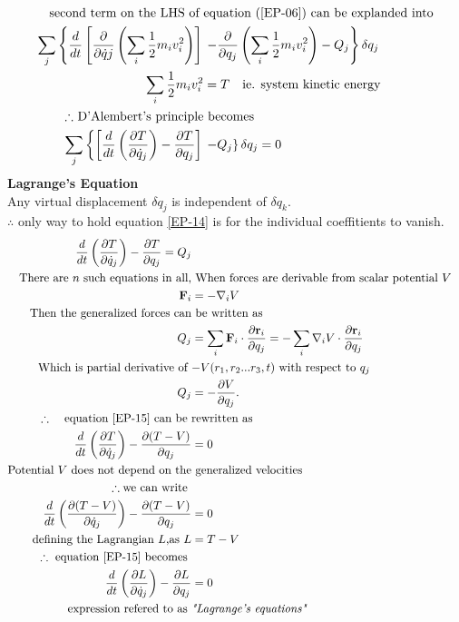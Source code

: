 \begin{align}
\text{second term on the LHS of }&\text{equation (\ref{EP-06}) can be explanded into}\notag\\
\sum_{j}\left\{\frac{d}{d t}\left[\frac{\partial}{\partial \dot{q} j}\left(\sum_{i} \frac{1}{2} m_{i} v_{i}^{2}\right)\right]\right. &\left. -\frac{\partial}{\partial q_{j}}\left(\sum_{i} \frac{1}{2} m_{i} v_{i}^{2}\right)-Q_{j}\right\} \delta q_{j}\notag\\
\sum_{i} \frac{1}{2} m_{i} v_{i}^{2}&=T\quad \text{ie. system kinetic energy}\notag\\
\text{$\therefore$ D'Alembert's principle}&\text{ becomes }\notag\\
\sum_{j}\left\{\left[\frac{d}{d t}\left(\frac{\partial T}{\partial \dot{q}_{j}}\right)-\frac{\partial T}{\partial q_{j}}\right]\right.& \left. -Q_{j}\right\} \delta q_{j}=0\label{EP-14}
\end{align}
\textbf{Lagrange's Equation}\\
Any virtual displacement $\delta q_j$ is independent of $\delta q_k.$\\
$\therefore$ \quad only way to hold equation \ref{EP-14} is for the individual coeffitients to vanish.
\begin{align}
\frac{d}{d t}\left(\frac{\partial T}{\partial \dot{q}_{j}}\right)-\frac{\partial T}{\partial q_{j}}=Q_{j}\label{EP-15}\\
\text{There are $n$ such equations in all,}&\text{ When forces are derivable from scalar potential $V$}\notag\\
\mathbf{F}_{i}&=-\nabla_{i} V\notag\\
\text{Then the generalized forces can}&\text{ be written as}\notag\\
Q_{j}&=\sum_{i} \mathbf{F}_{i} \cdot \frac{\partial \mathbf{r}_{i}}{\partial q_{j}}=-\sum_{i} \nabla_{i} V \cdot \frac{\partial \mathbf{r}_{i}}{\partial q_{j}}\notag\\
\text{Which is partial derivative of }&\text{$-V(r_1,r_2...r_3,t)$ with respect to $q_j$}\notag\\
Q_{j}&=-\frac{\partial V}{\partial q_{j}} .\label{EP-16}\\
\text{$\therefore$ \quad equation \ref{EP-15} can be }&\text{rewritten as}\notag\\
\frac{d}{d t}\left(\frac{\partial T}{\partial \dot{q}_{j}}\right)-\frac{\partial (T-V)}{\partial q_{j}}&=0\\
\text{Potential $V$ does not depend on the}&\text{ generalized velocities }\notag\\
\therefore \text{we can write }\notag\\
\frac{d}{d t}\left( \frac{\partial (T-V)}{\partial \dot{q}_{j}} \right)  -\frac{\partial (T-V)}{\partial q_{j}}&=0\notag\\
\text{defining the Lagrangian $L$,as }L&=T-V\notag\\
\therefore \text{ equation \ref{EP-15} becomes }&\notag\\
\frac{d}{d t}\left(\frac{\partial L}{\partial \dot{q}_{j}}\right)-\frac{\partial L}{\partial q_{j}}&=0\notag\\
\text{expression refered to as }&\textit{"Lagrange's equations"}\notag
\end{align}
